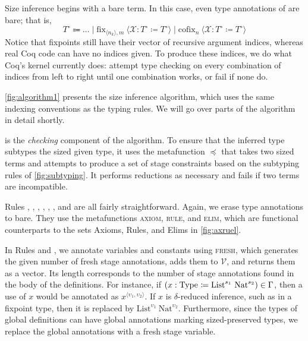 \documentclass[sigplan,10pt,anonymous,review]{acmart}
\begin{document}


Size inference begins with a bare term. In this case, even type annotations of \cofixpoints are bare; that is, $$T^\circ \Coloneqq \dots \mid \text{fix}_{\langle n_k \rangle, m}\ \langle \mathcal{X} : T^\circ \coloneqq T^\circ \rangle \mid \text{cofix}_{n}\ \langle \mathcal{X} : T^\circ \coloneqq T^\circ \rangle$$
Notice that fixpoints still have their vector of recursive argument indices, whereas real Coq code can have no indices given. To produce these indices, we do what Coq's kernel currently does: attempt type checking on every combination of indices from left to right until one combination works, or fail if none do.

\autoref{fig:algorithm1} presents the size inference algorithm, which uses the same indexing conventions as the typing rules. We will go over parts of the algorithm in detail shortly.

 is the \textit{checking} component of the algorithm. To ensure that the inferred type subtypes the sized given type, it uses the metafunction $\preceq$ that takes two sized terms and attempts to produce a set of stage constraints based on the subtyping rules of \autoref{fig:subtyping}. It performs reductions as necessary and fails if two terms are incompatible.

Rules , , , , , , and  are all fairly straightforward. Again, we erase type annotations to bare. They use the metafunctions \textsc{axiom}, \textsc{rule}, and \textsc{elim}, which are functional counterparts to the sets Axioms, Rules, and Elims in \autoref{fig:axruel}.

In Rules  and , we annotate variables and constants using \textsc{fresh}, which generates the given number of fresh stage annotations, adds them to $\mathcal{V}$, and returns them as a vector. Its length corresponds to the number of stage annotations found in the body of the definitions. For instance, if $(x : \Type{} \coloneqq \text{List}^{s_1}\ \text{Nat}^{s_2}) \in \Gamma$, then a use of $x$ would be annotated as $x^{\langle \upsilon_1, \upsilon_2 \rangle}$. If $x$ is $\delta$-reduced inference, such as in a fixpoint type, then it is replaced by $\text{List}^{\upsilon_1}\ \text{Nat}^{\upsilon_2}$. Furthermore, since the types of global definitions can have global annotations marking sized-preserved types, we replace the global annotations with a fresh stage variable.
\end{document}
